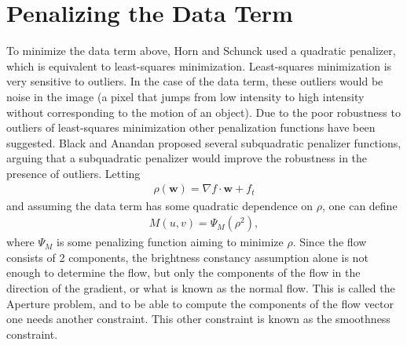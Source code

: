 \section{Penalizing the Data Term}
To minimize the data term above, Horn and Schunck used a quadratic penalizer, which is equivalent to least-squares minimization. Least-squares minimization is very sensitive to outliers. In the case of the data term, these outliers would be noise in the image (a pixel that jumps from low intensity to high intensity without corresponding to the motion of an object). Due to the poor robustness to outliers of least-squares minimization other penalization functions have been suggested. Black and Anandan \cite{Black199675} proposed several subquadratic penalizer functions, arguing that a subquadratic penalizer would improve the robustness in the presence of outliers. Letting
\begin{align*}
\rho(\textbf{w}) = \nabla f \cdot \textbf{w} + f_t
\end{align*}
and assuming the data term has some quadratic dependence on $\rho$, one can define
\begin{align}
\label{DataPenalize}
M(u,v) = \Psi_M(\rho^2),
\end{align}
where $\Psi_M$ is some penalizing function aiming to minimize $\rho$. Since the flow consists of 2 components, the brightness constancy assumption alone is not enough to determine the flow, but only the components of the flow in the direction of the gradient, or what is known as the normal flow. This is called the Aperture problem, and to be able to compute the components of the flow vector one needs another constraint. This other constraint is known as the smoothness constraint.